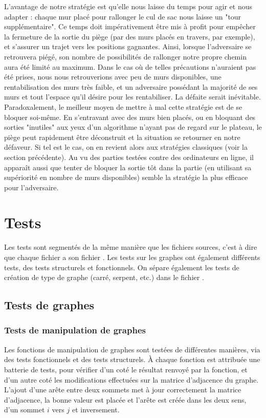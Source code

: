 \documentclass[a4paper]{article}
\begin{document}
L'avantage de notre stratégie est qu'elle nous laisse du temps pour agir et nous adapter : chaque mur placé pour rallonger le cul de sac nous laisse un "tour supplémentaire". Ce temps doit impérativement être mis à profit pour empêcher la fermeture de la sortie du piège (par des murs placés en travers, par exemple), et s'assurer un trajet vers les positions gagnantes. Ainsi, lorsque l'adversaire se retrouvera piégé, son nombre de possibilités de rallonger notre propre chemin aura été limité au maximum. Dans le cas où de telles précautions n'auraient pas été prises, nous nous retrouverions avec peu de murs disponibles, une rentabilisation des murs très faible, et un adversaire possédant la majorité de ses murs et tout l'espace qu'il désire pour les rentabiliser. La défaite serait inévitable. \\

Paradoxalement, le meilleur moyen de mettre à mal cette stratégie est de se bloquer soi-même. En s'entravant avec des murs bien placés, ou en bloquant des sorties "inutiles" aux yeux d'un algorithme n'ayant pas de regard sur le plateau, le piège peut rapidement être déconstruit et la situation se retourner en notre défaveur. Si tel est le cas, on en revient alors aux stratégies classiques (voir la section précédente). Au vu des parties testées contre des ordinateurs en ligne, il apparaît aussi que tenter de bloquer la sortie tôt dans la partie (en utilisant sa supériorité en nombre de murs disponibles) semble la stratégie la plus efficace pour l'adversaire.

 

\section{Tests}

Les tests sont segmentés de la même manière que les fichiers sources, c'est à dire que chaque fichier  a son fichier . Les tests sur les graphes ont également différents tests, des tests structurels et fonctionnels. On sépare également les tests de création de type de graphe (carré, serpent, etc.) dans le fichier .

\subsection{Tests de graphes}
\subsubsection{Tests de manipulation de graphes}
Les fonctions de manipulation de graphes sont testées de différentes manières, via des tests fonctionnels et des tests structurels. À chaque fonction est attribuée une batterie de tests, pour vérifier d'un coté le résultat renvoyé par la fonction, et d'un autre coté les modifications effectuées sur la matrice d'adjacence du graphe. L'ajout d'une arête entre deux sommets met à jour correctement la matrice d'adjacence, la bonne valeur est placée et l'arête est créée dans les deux sens, d'un sommet $i$ vers $j$ et inversement. \\
\end{document}

